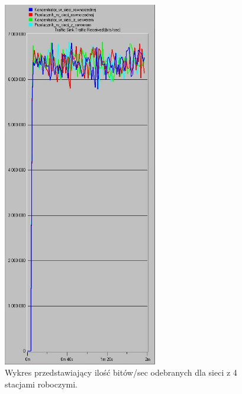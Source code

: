 \documentclass{article}
\begin{document}
\begin{figure}[H]
  \centering
  \includegraphics[width=0.60\textwidth]{screens/4_recv.png}
 \caption{Wykres przedstawiający ilość bitów/sec odebranych dla sieci z 4 stacjami roboczymi.}
 \label{fig:4stacjer}
\end{figure}
\end{document}
